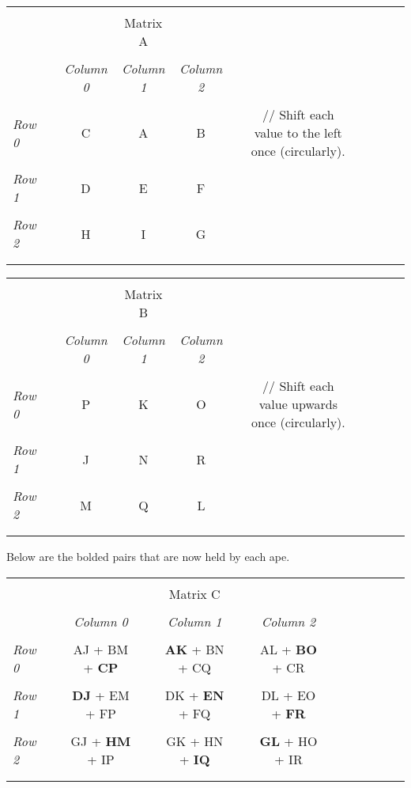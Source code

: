 \documentclass[10pt]{article}
\begin{document}
\begin{tabular}{l*{9}{c}r}
  \\
  \\
  & & & Matrix A \\
  \\
  & &
  \textit{Column 0} &
  \textit{Column 1} &
  \textit{Column 2} & \\
  \\
  \textit{Row 0} & & C & A & B && // Shift each value to the left once (circularly).\\
  \\
  \textit{Row 1} & & D & E & F \\
  \\
  \textit{Row 2} & & H & I & G \\
  \\
  \\
\end{tabular}

\begin{tabular}{l*{9}{c}r}
  \\
  \\
  & & & Matrix B \\
  \\
  & &
  \textit{Column 0} &
  \textit{Column 1} &
  \textit{Column 2} & \\
  \\
  \textit{Row 0} & & P & K & O && // Shift each value upwards once (circularly).\\
  \\
  \textit{Row 1} & & J & N & R \\
  \\
  \textit{Row 2} & & M & Q & L \\
  \\
  \\
\end{tabular}

Below are the bolded pairs that are now held by each ape. \par

\begin{tabular}{l*{11}{c}r}
  \\
  \\
  && && Matrix C \\
  \\
  & &
  \textit{Column 0} &&
  \textit{Column 1} &&
  \textit{Column 2} \\
  \\
  \textit{Row 0} && AJ + BM + \textbf{CP} && \textbf{AK} + BN + CQ && AL + \textbf{BO} + CR \\
  \\
  \textit{Row 1} && \textbf{DJ} + EM + FP && DK + \textbf{EN} + FQ && DL + EO + \textbf{FR} \\
  \\
  \textit{Row 2} && GJ + \textbf{HM} + IP && GK + HN + \textbf{IQ} && \textbf{GL} + HO + IR \\
  \\
  \\
\end{tabular}
\end{document}
